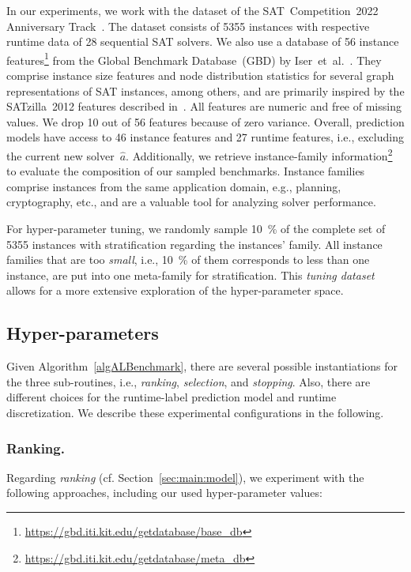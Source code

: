 \documentclass[runningheads]{llncs}
\begin{document}
In our experiments, we work with the dataset of the SAT~Competition~2022 Anniversary Track~\cite{sat2022}.
The dataset consists of 5355 instances with respective runtime data of 28 sequential SAT solvers.
We also use a database of 56 instance features\footnote{\url{https://gbd.iti.kit.edu/getdatabase/base_db}} from the Global Benchmark Database~(GBD) by Iser~et~al.~\cite{IserS18}.
They comprise instance size features and node distribution statistics for several graph representations of SAT instances, among others, and are primarily inspired by the SATzilla~2012 features described in~\cite{features}.
All features are numeric and free of missing values.
We drop 10 out of 56 features because of zero variance.
Overall, prediction models have access to 46 instance features and 27 runtime features, i.e., excluding the current new solver~$\hat{a}$.
Additionally, we retrieve instance-family information\footnote{\url{https://gbd.iti.kit.edu/getdatabase/meta_db}} to evaluate the composition of our sampled benchmarks.
Instance families comprise instances from the same application domain, e.g., planning, cryptography, etc., and are a valuable tool for analyzing solver performance.

For hyper-parameter tuning, we randomly sample \SI{10}{\%} of the complete set of 5355 instances with stratification regarding the instances' family.
All instance families that are too \emph{small}, i.e., \SI{10}{\%} of them corresponds to less than one instance, are put into one meta-family for stratification.
This \emph{tuning dataset} allows for a more extensive exploration of the hyper-parameter space.

\subsection{Hyper-parameters}
\label{sec:exdesign:hyper}

Given Algorithm~\ref{algALBenchmark}, there are several possible instantiations for the three sub-routines, i.e., \emph{ranking}, \emph{selection}, and \emph{stopping}.
Also, there are different choices for the runtime-label prediction model and runtime discretization.
We describe these experimental configurations in the following.

\subsubsection{Ranking.}

Regarding \emph{ranking} (cf. Section~\ref{sec:main:model}), we experiment with the following approaches, including our used hyper-parameter values:
\end{document}
